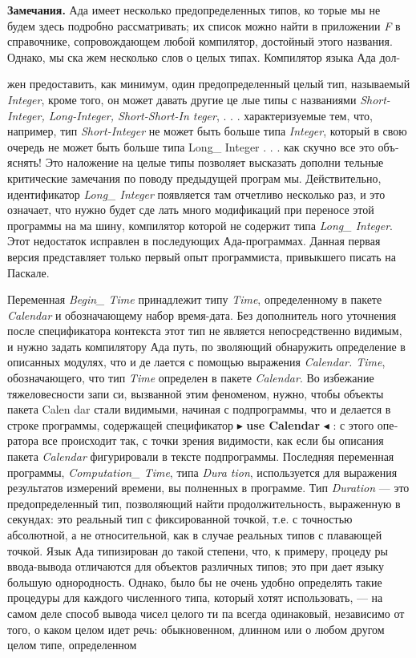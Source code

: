 \begin{center}
\parbox{12cm} {
{\bf Замечания.} Ада имеет несколько предопределенных типов, ко­
торые мы не будем здесь подробно рассматривать; их список
можно найти в приложении {\it F} в справочнике, сопровождающем
любой компилятор, достойный этого названия. Однако, мы ска­
жем несколько слов о целых типах. Компилятор языка Ада дол-}
\end{center}
\newpage
\begin{center}
\parbox{12cm}{
жен предоставить, как минимум, один предопределенный целый
тип, называемый {\it Integer}, кроме того, он может давать другие це­
лые типы с названиями {\it Short-Integer, Long-Integer, Short-Short-In­
teger}, . . . характеризуемые тем, что, например, тип {\it Short-Integer}
не может быть больше типа {\it Integer}, который в свою очередь не
может быть больше типа {Long\_ Integer} . . . как скучно все это объ­
яснять!
Это наложение на целые типы позволяет высказать дополни­
тельные критические замечания по поводу предыдущей програм­
мы. Действительно, идентификатор {\it Long\_ Integer} появляется там
отчетливо несколько раз, и это означает, что нужно будет сде­
лать много модификаций при переносе этой программы на ма­
шину, компилятор которой не содержит типа {\it Long\_ Integer}. Этот
недостаток исправлен в последующих Ада-программах. Данная
первая версия представляет только первый опыт программиста,
привыкшего писать на Паскале.}
\end{center}
Переменная {\it Begin\_ Time} принадлежит типу {\it Time}, определенному в
пакете {\it Calendar} и обозначающему набор время-дата. Без дополнитель­
ного уточнения после спецификатора контекста этот тип не является
непосредственно видимым, и нужно задать компилятору Ада путь, по­
зволяющий обнаружить определение в описанных модулях, что и де­
лается с помощью выражения {\it Calendar. Time}, обозначающего, что тип
{\it Time} определен в пакете {\it Calendar}. Во избежание тяжеловесности запи­
си, вызванной этим феноменом, нужно, чтобы объекты пакета Calen­
dar стали видимыми, начиная с подпрограммы, что и делается в строке
программы, содержащей спецификатор $\blacktriangleright$ {\bf use Calendar }$\blacktriangleleft$ : с этого опе­
ратора все происходит так, с точки зрения видимости, как если бы
описания пакета {\it Calendar} фигурировали в тексте подпрограммы.
Последняя переменная программы, {\it Computation\_ Time}, типа {\it Dura­
tion}, используется для выражения результатов измерений времени, вы­
полненных в программе. Тип {\it Duration} — это предопределенный тип,
позволяющий найти продолжительность, выраженную в секундах: это
реальный тип с фиксированной точкой, т.е. с точностью абсолютной,
а не относительной, как в случае реальных типов с плавающей точкой.
Язык Ада типизирован до такой степени, что, к примеру, процеду­
ры ввода-вывода отличаются для объектов различных типов; это при­
дает языку большую однородность. Однако, было бы не очень удобно
определять такие процедуры для каждого численного типа, который
хотят использовать, — на самом деле способ вывода чисел целого ти­
па всегда одинаковый, независимо от того, о каком целом идет речь:
обыкновенном, длинном или о любом другом целом типе, определенном

